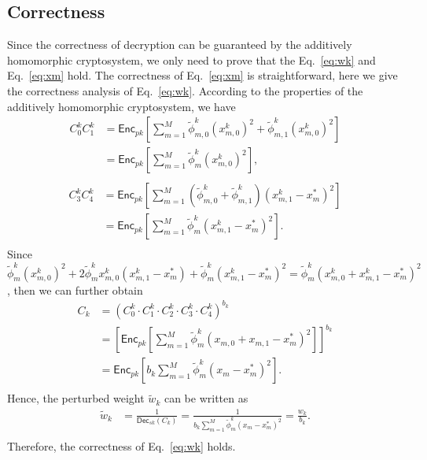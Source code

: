 \documentclass[conference]{IEEEtran}
\begin{document}
\subsection{Correctness}
Since the correctness of decryption can be guaranteed by the additively homomorphic cryptosystem, we only need to prove that the Eq.~\ref{eq:wk} and Eq.~\ref{eq:xm} hold.
The correctness of Eq.~\ref{eq:xm} is straightforward, here we give the correctness analysis of Eq.~\ref{eq:wk}.
According to the properties of the additively homomorphic cryptosystem, we have
\begin{equation*}
  \begin{split}
  C_0^k C_1^k & = \mathsf{Enc}_{pk}\left[\sum_{m=1}^M \tilde{\phi}_{m,0}^k\left(x_{m,0}^k\right)^2 + \tilde{\phi}_{m,1}^k\left(x_{m,0}^k\right)^2  \right] \\
   & = \mathsf{Enc}_{pk}\left[\sum_{m=1}^M \tilde{\phi}_m^k\left(x_{m,0}^k\right)^2 \right] , \\
  \end{split}
\end{equation*}
\begin{equation*}
  \begin{split}
  C_3^kC_4^k & = \mathsf{Enc}_{pk}\left[\sum_{m=1}^M \left(\tilde{\phi}_{m,0}^k + \tilde{\phi}_{m,1}^k\right) \left(x_{m,1}^k-x_m^*\right)^2 \right] \\
  & = \mathsf{Enc}_{pk}\left[\sum_{m=1}^M \tilde{\phi}_m^k\left(x_{m,1}^k - x_m^*\right)^2\right] . \\
  \end{split}
\end{equation*}
Since $\tilde{\phi}_m^k (x_{m,0}^k)^2 + 2\tilde{\phi}_m^kx_{m,0}^k\left(x_{m,1}^k - x_m^*\right) + \tilde{\phi}_m^k(x_{m,1}^k - x_m^*)^2 = \tilde{\phi}_m^k (x_{m,0}^k + x_{m,1}^k - x_m^*)^2$, then we can further obtain
\begin{equation*}
  \begin{split}
  C_k & = \left(C_0^k \cdot C_1^k\cdot C_2^k \cdot C_3^k \cdot C_4^k\right)^{b_k} \\
   & = \left[\mathsf{Enc}_{pk}\left[\sum_{m=1}^M \tilde{\phi}_m^k (x_{m,0} + x_{m,1} - x_m^*)^2 \right]\right]^{b_k} \\
  & = \mathsf{Enc}_{pk}\left[b_k \sum_{m=1}^M \tilde{\phi}_m^k (x_m - x_m^*)^2 \right] . \\
  \end{split}
\end{equation*}
Hence, the perturbed weight $\tilde{w}_k$ can be written as
\begin{equation*}
  \begin{split}
  \tilde{w}_k & = \frac{1}{\mathsf{Dec}_{sk}\left(C_k\right)} = \frac{1}{b_k \sum_{m=1}^M \tilde{\phi}_m^k (x_m - x_m^*)^2} = \frac{w_k}{b_k} . \\
  \end{split}
\end{equation*}
Therefore, the correctness of Eq.~\ref{eq:wk} holds.
\end{document}
